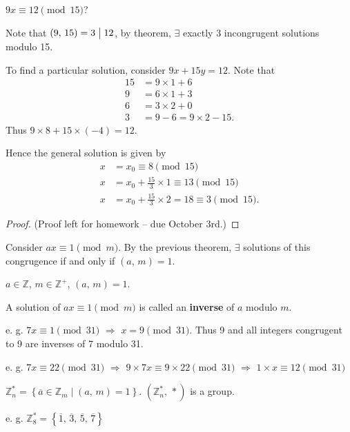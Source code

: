 \begin{example}
    $9x \equiv 12\pmod{15}$?

    Note that $\left(9,\,15\right)=3\bigm| 12$, by theorem,
    $\exists$ exactly 3 incongrugent solutions modulo 15.

    To find a particular solution, consider $9x+15y=12$.
    Note that
    \begin{align*}
        15&=9 \times 1 + 6 \\
        9&=6 \times 1 + 3 \\
        6&=3 \times 2 + 0 \\
        3&=9-6=9\times 2 - 15.
    \end{align*}
    Thus $9 \times 8 + 15 \times \left(-4\right) = 12$.

    Hence the general solution is given by
    \begin{align*}
        x&=x_0\equiv8 \pmod{15} \\ 
        x&=x_0+\frac{15}{3}\times 1\equiv13 \pmod{15} \\ 
        x&=x_0+\frac{15}{3}\times 2=18\equiv 3 \pmod{15}.
    \end{align*}
\end{example}

\begin{proof}
    (Proof left for homework -- due October 3rd.)
\end{proof}

\begin{remark}
    Consider $ax \equiv 1\pmod{m}$.
    By the previous theorem, $\exists$ solutions of this congrugence
    if and only if $\left(a,\,m\right) = 1$.
\end{remark}

\begin{definition}
    $a \in \mathbb{Z}$, $m \in \mathbb{Z}^+$, $\left(a,\,m\right)=1$.

    A solution of $ax \equiv 1\pmod{m}$ is called an \textbf{inverse} of
    $a$ modulo $m$.
\end{definition}

e. g. $7x\equiv 1\pmod{31}$ $\Rightarrow$ $x=9\pmod{31}$.
Thus 9 and all integers congrugent to 9 are inverses of 7 modulo 31.

e. g. $7x \equiv 22\pmod{31}$ $\Rightarrow$ $9\times 7x \equiv 9\times 22\pmod{31}$
$\Rightarrow$ $1\times x \equiv 12\pmod{31}$

\begin{remark}
    $\mathbb{Z}_n^*=\left\{\overline{a}\in \mathbb{Z}_m \mid \left(a,\,m\right)=1\right\}$.
    $\left(\mathbb{Z}_n^*,\,*\right)$ is a group.
\end{remark}

e. g. $\mathbb{Z}_{8}^*=\left\{\overline{1},\,\overline{3},\,\overline{5},\,\overline{7}\right\}$